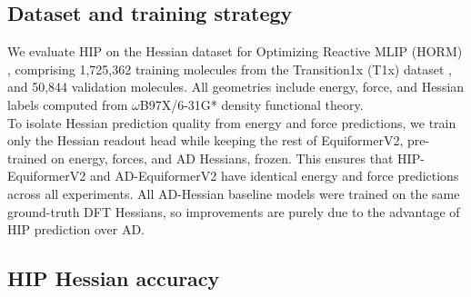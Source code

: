 \documentclass[pdflatex,sn-mathphys-num]{sn-jnl}%
\theoremstyle{thmstyleone}%
\theoremstyle{thmstyletwo}%
\theoremstyle{thmstylethree}%
\begin{document}


\subsection{Dataset and training strategy}
We evaluate HIP on the Hessian dataset for Optimizing Reactive MLIP (HORM) \cite{cui2025horm}, comprising 1,725,362 training molecules from the Transition1x (T1x) dataset \cite{schreiner2022transition1x}, and 50,844 validation molecules. All geometries include energy, force, and Hessian labels computed from $\omega$B97X/6-31G* density functional theory.\\
To isolate Hessian prediction quality from energy and force predictions, we train only the Hessian readout head while keeping the rest of EquiformerV2, pre-trained on energy, forces, and AD Hessians, frozen. This ensures that HIP-EquiformerV2 and AD-EquiformerV2 have identical energy and force predictions across all experiments. All AD-Hessian baseline models were trained on the same ground-truth DFT Hessians, so improvements are purely due to the advantage of HIP prediction over AD.

\subsection{HIP Hessian accuracy}
\end{document}
